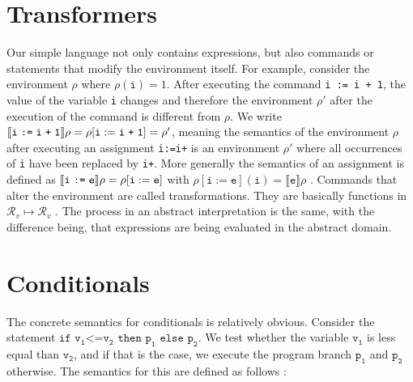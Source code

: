 \section{Transformers}

Our simple language not only contains expressions, but also commands or statements that modify the environment itself. For example, consider the environment $\rho$ where $\rho(\mathtt{i})=1$. After executing the command \texttt{i := i + 1}, the value of the variable \texttt{i} changes and therefore the environment $\rho'$ after the execution of the command is different from $\rho$. We write $\llbracket \texttt{i\;:=\;i\;+\;1} \rrbracket\rho=\rho[\mathtt{i}:=\texttt{i\;+\;1}]=\rho'$, meaning the semantics of the environment $\rho$ after executing an assignment \texttt{i\;:=\;i\;+} is an environment $\rho'$ where all occurrences of \texttt{i} have been replaced by \texttt{i\;+}. 
More generally the semantics of an assignment is defined as $\llbracket \texttt{i\;:=\;e} \rrbracket\rho=\rho[\mathtt{i}:=\texttt{e}]$ with $\rho[\mathtt{i}:=\texttt{e}](\mathtt{i})=\llbracket\mathtt{e}\rrbracket\rho$ \cite{cousot2011}. Commands that alter the environment are called transformations. They are basically functions in $\mathcal{R}_v\mapsto\mathcal{R}_v$ \cite{scott1971}.
The process in an abstract interpretation is the same, with the difference being, that expressions are being evaluated in the abstract domain.

\section{Conditionals}\label{sec:conditionals}

The concrete semantics for conditionals is relatively obvious. Consider the statement $\texttt{if v}_\texttt{1}\texttt{<=v}_\texttt{2} \texttt{ then p}_\texttt{1} \texttt{ else p}_\texttt{2}$. We test whether the variable $\texttt{v}_\texttt{1}$ is less equal than $\texttt{v}_\texttt{2}$, and if that is the case, we execute the program branch $\texttt{p}_\texttt{1}$ and $\texttt{p}_\texttt{2}$ otherwise. The semantics for this are defined as follows \cite{scott1971}: 

